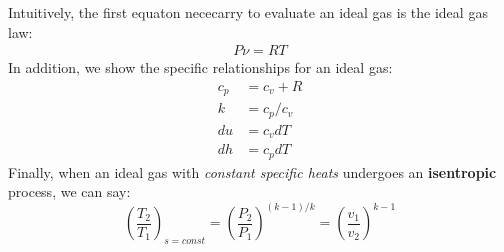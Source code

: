 \documentclass{article}
\begin{document}
\begin{enumerate}
\begin{enumerate}
\begin{enumerate}
                Intuitively, the first equaton nececarry to evaluate an ideal gas is the ideal gas law:
                \begin{equation}
                    \label{idealGas}
                    \begin{aligned}
                    P\nu=RT
                    \end{aligned}
                \end{equation}
                In addition, we show the specific relationships for an ideal gas:
                \begin{equation}
                    \label{ig_relation}
                    \begin{aligned}
                        c_p &= c_v+R\\
                        k &= c_p/c_v\\
                    du &= c_vdT\\
                    dh &= c_pdT
                \end{aligned}\end{equation}
                Finally, when an ideal gas with \emph{constant specific heats} undergoes an {\bf isentropic} process, we can say:
                \begin{equation}
                    \label{pvt}
                        \left(\frac{T_2}{T_1}\right)_{s=const} = \left(\frac{P_2}{P_1}\right)^{(k-1)/k}=\left(\frac{v_1}{v_2}\right)^{k-1}
                \end{equation}

        \end{enumerate}
    \end{enumerate}



\end{enumerate}
\end{document}
